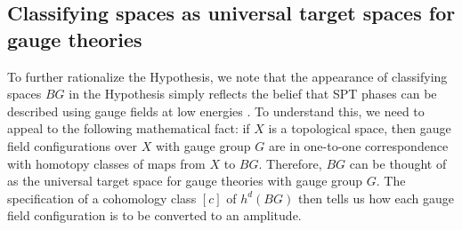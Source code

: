 \documentclass[sort&compress]{elsarticle}
\theoremstyle{theoremstyle}
\theoremstyle{framedtheoremstyle}
\theoremstyle{definitionstyle}
\theoremstyle{definitionstyle}
\theoremstyle{definitionstyle}
\theoremstyle{definitionstyle}
\theoremstyle{nameddefinitionstyle}
\theoremstyle{framednameddefinitionstyle}
\theoremstyle{proofstyle}
\theoremstyle{definitionstyle}
\renewcommand{\SS}{\mathbf{S}}
\newcommand{\colim}{\underset{\longrightarrow}{\lim}}
\begin{document}
%







\subsection{Classifying spaces as universal target spaces for gauge theories\label{subsec:rationale_classifying_spaces}}

To further rationalize the Hypothesis, we note that the appearance of classifying spaces $BG$ in the Hypothesis simply reflects the belief that SPT phases can be described using gauge fields at low energies \cite{Wen_Boson}. To understand this, we need to appeal to the following mathematical fact: if $X$ is a topological space, then gauge field configurations over $X$ with gauge group $G$ are in one-to-one correspondence with homotopy classes of maps from $X$ to $BG$. Therefore, $BG$ can be thought of as the universal target space for gauge theories with gauge group $G$. The specification of a cohomology class $[c]$ of $h^d(BG)$ then tells us how each gauge field configuration is to be converted to an amplitude.
\end{document}
